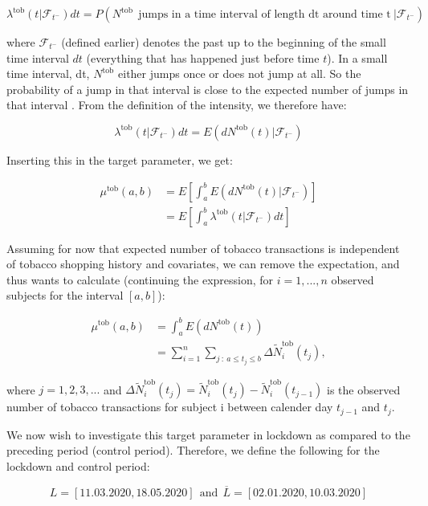 \documentclass[
  11pt,
]{article}
\begin{document}
\begin{equation}
\label{intensity}
\lambda^{\text{tob}} (t | \mathcal{F}_{t^-}) dt =P(N^{\text{tob}} \ \ \text{jumps in a time interval of length dt around time t} \ |  \mathcal{F}_{t^-})
\end{equation}

where \(\mathcal{F}_{t^-}\) (defined earlier) denotes the past up to the
beginning of the small time interval \(dt\) (everything that has
happened just before time \(t\)). In a small time interval, dt,
\(N^{\text{tob}}\) either jumps once or does not jump at all. So the
probability of a jump in that interval is close to the expected number
of jumps in that interval \cite{gill84}. From the definition of the
intensity, we therefore have:

\[
\lambda^{\text{tob}} (t|\mathcal{F}_{t^-}) dt = E(dN^{\text{tob}}(t)| \mathcal{F}_{t^-})
\]

Inserting this in the target parameter, we get:

\begin{align*}
\mu^{\text{tob}}(a, b) &= E \left[\int_a^b E(dN^{\text{tob}}(t) | \mathcal{F}_{t^-}) \right] \\
&= E \left[\int_a^b \lambda^{\text{tob}} (t|\mathcal{F}_{t^-}) dt\right]
\end{align*}

Assuming for now that expected number of tobacco transactions is
independent of tobacco shopping history and covariates, we can remove
the expectation, and thus wants to calculate (continuing the expression,
for \(i=1,...,n\) observed subjects for the interval \([a,b]\)):

\begin{align*}
\mu^{\text{tob}}(a, b) &= \int_a^b E(dN^{\text{tob}}(t))  \\
&= \sum_{i=1}^n \sum_{j \ : \ a \leq t_j \leq b} \Delta \tilde{N}_i^{\text{tob}}(t_j),
\end{align*}

where \(j=1,2,3,...\) and
\(\Delta \tilde{N}_i^{\text{tob}}(t_j)=\tilde{N}_i^{\text{tob}}(t_j)-\tilde{N}_i^{\text{tob}}(t_{j-1})\)
is the observed number of tobacco transactions for subject i between
calender day \(t_{j-1}\) and \(t_j\).

We now wish to investigate this target parameter in lockdown as compared
to the preceding period (control period). Therefore, we define the
following for the lockdown and control period:

\[
L = [11.03.2020, 18.05.2020] \ \ \text{and} \ \ \overline{L}= [02.01.2020, 10.03.2020]
\]
\end{document}
